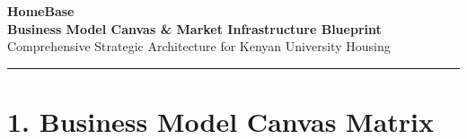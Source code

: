 \documentclass[11pt,a4paper]{article}
\begin{document}
\begin{center}
    {\Huge \bfseries \color{primary} HomeBase} \\[0.5em]
    {\Large \bfseries Business Model Canvas \& Market Infrastructure Blueprint} \\[0.25em]
    {\small \color{darkgray} Comprehensive Strategic Architecture for Kenyan University Housing} \\[0.5em]
    \rule{\textwidth}{1pt}
\end{center}

\vspace{1em}

\section*{1. Business Model Canvas Matrix}

\vspace{0.5em}
\end{document}
